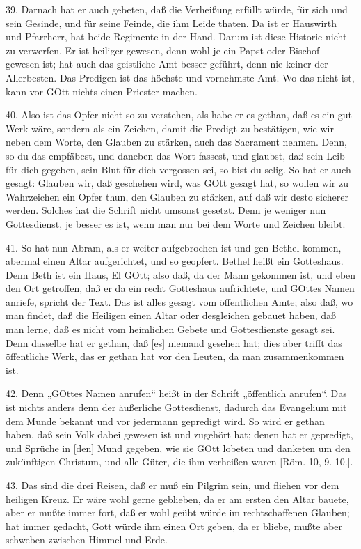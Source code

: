 39. Darnach hat er auch gebeten, daß die Verheißung erfüllt würde, für sich und sein Gesinde, und für seine Feinde, die ihm Leide thaten. Da ist er Hauswirth und Pfarrherr, hat beide Regimente in der Hand. Darum ist diese Historie nicht zu verwerfen. Er ist heiliger gewesen, denn wohl je ein Papst oder Bischof gewesen ist; hat auch das geistliche Amt besser geführt, denn nie keiner der Allerbesten. Das Predigen ist das höchste und vornehmste Amt. Wo das nicht ist, kann vor GOtt nichts einen Priester machen.

40. Also ist das Opfer nicht so zu verstehen, als habe er es gethan, daß es ein gut Werk wäre, sondern als ein Zeichen, damit die Predigt zu bestätigen, wie wir neben dem Worte, den Glauben zu stärken, auch das Sacrament nehmen. Denn, so du das empfäbest, und daneben das Wort fassest, und glaubst, daß sein Leib für dich gegeben, sein Blut für dich vergossen sei, so bist du selig. So hat er auch gesagt: Glauben wir, daß geschehen wird, was GOtt gesagt hat, so wollen wir zu Wahrzeichen
ein Opfer thun, den Glauben zu stärken, auf daß wir desto sicherer werden. Solches hat die Schrift nicht umsonst gesetzt. Denn je weniger nun Gottesdienst, je besser es ist, wenn man nur bei dem Worte und Zeichen bleibt.

41. So hat nun Abram, als er weiter aufgebrochen ist und gen Bethel kommen, abermal einen Altar aufgerichtet, und so geopfert. Bethel heißt ein Gotteshaus. Denn Beth ist ein Haus, El GOtt; also daß, da der Mann gekommen ist, und eben den Ort getroffen, daß er da ein recht Gotteshaus aufrichtete, und GOttes Namen anriefe, spricht der Text. Das ist alles gesagt vom öffentlichen Amte; also daß, wo man findet, daß die Heiligen einen Altar oder desgleichen gebauet haben, daß man lerne, daß es nicht vom heimlichen Gebete und Gottesdienste gesagt sei. Denn dasselbe hat er gethan, daß [es] niemand gesehen hat; dies aber trifft das öffentliche Werk, das er gethan hat vor den Leuten, da man zusammenkommen ist.

42. Denn „GOttes Namen anrufen“ heißt in der Schrift „öffentlich anrufen“. Das ist nichts anders denn der äußerliche Gottesdienst, dadurch das Evangelium mit dem Munde bekannt und vor jedermann gepredigt wird. So wird er gethan haben, daß sein Volk dabei gewesen ist und zugehört hat; denen hat er gepredigt, und Sprüche in [den] Mund gegeben, wie sie GOtt lobeten und danketen um den zukünftigen Christum, und alle Güter, die ihm verheißen waren [Röm. 10, 9. 10.].

43. Das sind die drei Reisen, daß er muß ein Pilgrim sein, und fliehen vor dem heiligen Kreuz. Er wäre wohl gerne geblieben, da er am ersten den Altar bauete, aber er mußte immer fort, daß er wohl geübt würde im rechtschaffenen Glauben; hat immer gedacht, Gott würde ihm einen Ort geben, da er bliebe, mußte aber schweben zwischen Himmel und Erde.

